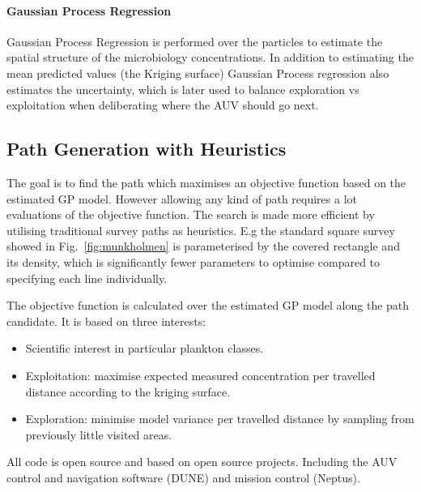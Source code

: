 \documentclass[conference]{IEEEtran}
\newcommand{\cmt}[1]{{\color{red}{#1}}}
\begin{document}
\paragraph{Gaussian Process Regression} 
Gaussian Process Regression is performed over the particles to estimate the spatial structure of the microbiology concentrations.
In addition to estimating the mean predicted values (the Kriging surface)
Gaussian Process regression also estimates the uncertainty, which is
later used to balance exploration vs exploitation when deliberating
where the AUV should go next.

\subsection{Path Generation with Heuristics}
The goal is to find the path which maximises an objective function
based on the estimated GP model.
However allowing any kind
of path requires a lot evaluations of the objective function. The
search is made more efficient by utilising traditional survey paths as
heuristics. E.g the standard square survey showed in
Fig.~\ref{fig:munkholmen} is parameterised by the covered rectangle
and its density, which is significantly fewer parameters to optimise
compared to specifying each line individually.

The objective function is calculated over the estimated GP model along
the path candidate. It is based on three interests:

\begin{itemize}
    \item Scientific interest in particular plankton classes. 
    \item Exploitation: maximise expected measured concentration per travelled distance
      according to the kriging surface. 
    \item Exploration: minimise model variance per travelled distance by sampling from
      previously little visited areas.
\end{itemize}
All code is open source and based on open source projects. Including
the AUV control and navigation software (DUNE) and mission control
(Neptus)\cite{pinto2013lsts}.
\end{document}
